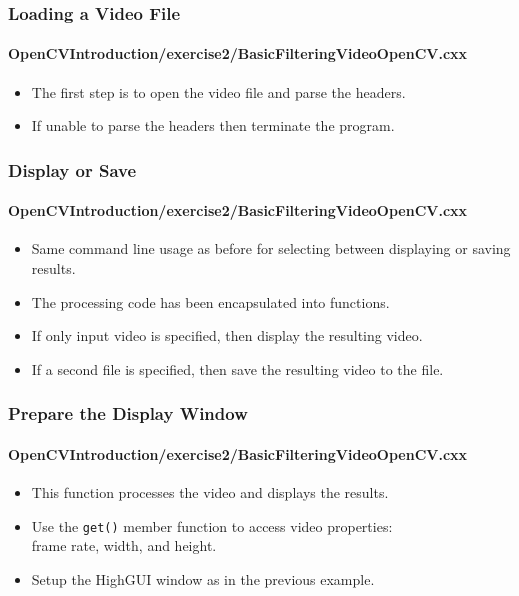 \begin{frame}
\frametitle{Loading a Video File}
\framesubtitle{OpenCVIntroduction/exercise2/BasicFilteringVideoOpenCV.cxx}
\begin{center}
\begin{itemize}
\item The first step is to open the video file and parse the headers.
\item If unable to parse the headers then terminate the program.
\end{itemize}
\end{center}
\end{frame}


\begin{frame}
\frametitle{Display or Save}
\framesubtitle{OpenCVIntroduction/exercise2/BasicFilteringVideoOpenCV.cxx}
\begin{center}
\begin{itemize}
\item Same command line usage as before for selecting between displaying
      or saving results.
\item The processing code has been encapsulated into functions.
\item If only input video is specified, then display the resulting video.
\item If a second file is specified, then save the resulting video to the file.
\end{itemize}
\end{center}
\end{frame}


\begin{frame}
\frametitle{Prepare the Display Window}
\framesubtitle{OpenCVIntroduction/exercise2/BasicFilteringVideoOpenCV.cxx}
\begin{center}
\begin{itemize}
\item This function processes the video and displays the results.
\pause
\item Use the {\tt\small get()} member function to access video properties: \\
      frame rate, width, and height.
\pause
\item Setup the HighGUI window as in the previous example.
\end{itemize}
\end{center}
\end{frame}


